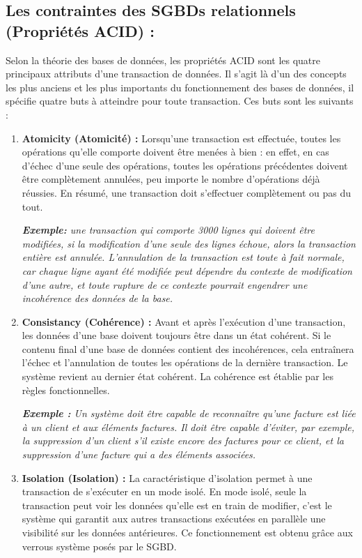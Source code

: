 \subsection{Les contraintes des SGBDs relationnels (Propriétés ACID) :}
Selon la théorie des bases de données, les propriétés ACID sont les quatre principaux attributs d'une transaction de données. Il s'agit là d'un des concepts les plus anciens et les plus importants du fonctionnement des bases de données, il spécifie quatre buts à atteindre pour toute transaction. Ces buts sont les suivants :

\begin{enumerate}
\item \textbf{Atomicity (Atomicité) :} Lorsqu’une transaction est effectuée, toutes les opérations qu’elle comporte doivent être menées à bien : en effet, en cas d’échec d’une seule des opérations, toutes les opérations précédentes doivent être complètement annulées, peu importe le nombre d’opérations déjà réussies. En résumé, une transaction doit s’effectuer complètement ou pas du tout.

\textit{\textbf{Exemple:} une transaction qui comporte 3000 lignes qui doivent être modifiées, si la modification d’une seule des lignes échoue, alors la transaction entière est annulée. L’annulation de la transaction est toute à fait normale, car chaque ligne ayant été modifiée peut dépendre du contexte de modification d’une autre, et toute rupture de ce contexte pourrait engendrer une incohérence des données de la base.}

\item \textbf{Consistancy (Cohérence) :} Avant et après l’exécution d’une transaction, les données d’une base doivent toujours être dans un état cohérent. Si le contenu final d’une base de données contient des incohérences, cela entraînera l’échec et l’annulation de toutes les opérations de la dernière transaction. Le système revient au dernier état cohérent. La cohérence est établie par les règles fonctionnelles.

\textit{\textbf{Exemple :} Un système doit être capable de reconnaître qu'une facture est liée à un client et aux éléments factures. Il doit être capable d'éviter, par exemple, la suppression d'un client s'il existe encore des factures pour ce client, et la suppression d'une facture qui a des éléments associées.}

\item \textbf{Isolation (Isolation) :} La caractéristique d’isolation permet à une transaction de s’exécuter en un mode isolé. En mode isolé, seule la transaction peut voir les données qu’elle est en train de modifier, c’est le système qui garantit aux autres transactions exécutées en parallèle une visibilité sur les données antérieures. Ce fonctionnement est obtenu grâce aux verrous système posés par le SGBD. 


\end{enumerate}
